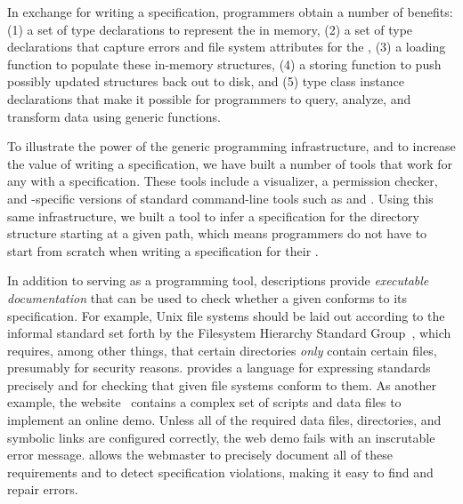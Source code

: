 
In exchange for writing a \forest{} specification,  programmers obtain
a number of benefits:
(1) a set of type declarations to represent the \filestore{} in memory,
(2) a set of type declarations that capture errors and file system attributes for the \filestore{},
(3) a loading function to populate these in-memory structures, 
(4) a storing function to push possibly updated structures back out to disk, and
(5) type class instance declarations that make it possible for
   programmers to query, analyze, and transform \filestore{} data
   using generic functions.

To illustrate the power of the generic programming infrastructure, and
to increase the value of writing a \forest{} specification, we have built a
number of tools that work for any \filestore{} with a
\forest{} specification.  These tools include a \filestore{}
visualizer, a permission checker, and \filestore{}-specific versions
of standard command-line tools such as  and .
Using this same infrastructure, we built a tool to infer
a \forest{} specification for the directory structure starting at a
given path, which means programmers do
not have to start from scratch when writing a specification for their
\filestores{}. 

In addition to serving as a programming tool,
\forest{} descriptions provide {\em executable documentation} that can
be used to check whether a given \filestore{} conforms to its
specification.  For example, Unix file systems should be laid out
according to the informal standard set forth by the Filesystem
Hierarchy Standard Group~\cite{fsh}, which requires, among other
things, that certain directories \textit{only} contain certain files,
presumably for security reasons. \forest{} provides a language for
expressing standards precisely and for checking that given file
systems conform to them.  As another example, the
\pads{} website~\cite{padsweb} contains a complex set of scripts and
data files to implement an online demo.  Unless all of the required
data files, directories, and symbolic links are configured correctly,
the web demo fails with an inscrutable error message.  \forest{}
allows the \pads{} webmaster to precisely document all of these
requirements and to detect specification violations, making it easy to
find and repair errors.



